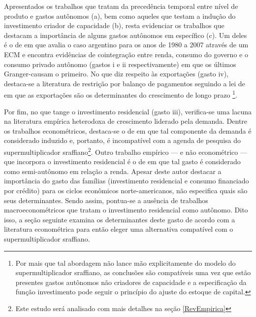 Apresentados os trabalhos que tratam da precedência temporal entre nível de produto e gastos autônomos (a), bem como aqueles que testam a indução do investimento criador de capacidade (b), resta evidenciar os trabalhos que destacam a importância de alguns gastos autônomos em específico (c). Um deles é o de \textcite{medici_cointegration_2011} em que avalia o caso argentino para os anos de 1980 a 2007 através de um ECM e encontra evidências de cointegração entre renda, consumo do governo e o consumo privado autônomo (gastos i e ii respectivamente) em que os últimos Granger-causam o primeiro. 
No que diz respeito às exportações (gasto iv), destaca-se a literatura de restrição por balanço de pagamentos seguindo a lei de \textcite{mccombie_balance--payments_1994} 
em que as exportações são os determinantes do crescimento de longo prazo \cites{atesoglu_balance--payments-constrained_1993}{mccombie_empirics_1997}{moreno-brid_mexicos_1999}{bertola_balance--payments-constrained_2002}\footnote{Por mais que tal abordagem não lance mão explicitamente do modelo do supermultiplicador sraffiano, as conclusões são compatíveis uma vez que estão presentes gastos autônomos não criadores de capacidade e a especificação da função investimento pode seguir o princípio do ajuste do estoque de capital.}.


Por fim, no que tange o investimento residencial (gasto iii), verifica-se uma lacuna na literatura empírica heterodoxa de crescimento liderado pela demanda. 
Dentre os trabalhos econométricos, destaca-se o de \textcite{arestis_residential_2015} em que tal componente da demanda é considerado induzido e, portanto, é incompatível com a agenda de pesquisa do supermultiplicador sraffiano\footnote{Este estudo será analisado com mais detalhes na seção \ref{RevEmpirica}}.
Outro trabalho empírico --- e não econométrico --- que incorpora o investimento residencial é o de \textcite{fiebiger_semi-autonomous_2018} em que tal gasto é considerado como semi-autônomo em relação a renda.
Apesar deste autor destacar a importância do gasto das famílias (investimento residencial e consumo financiado por crédito) para os ciclos econômicos norte-americanos, não especifica quais são seus determinantes.
Sendo assim, pontua-se a ausência de trabalhos macroeconométricos que tratam o investimento residencial como autônomo.
Dito isso, a seção seguinte examina os determinantes deste gasto de acordo com a literatura econométrica  para então eleger uma alternativa compatível com o supermultiplicador sraffiano.


